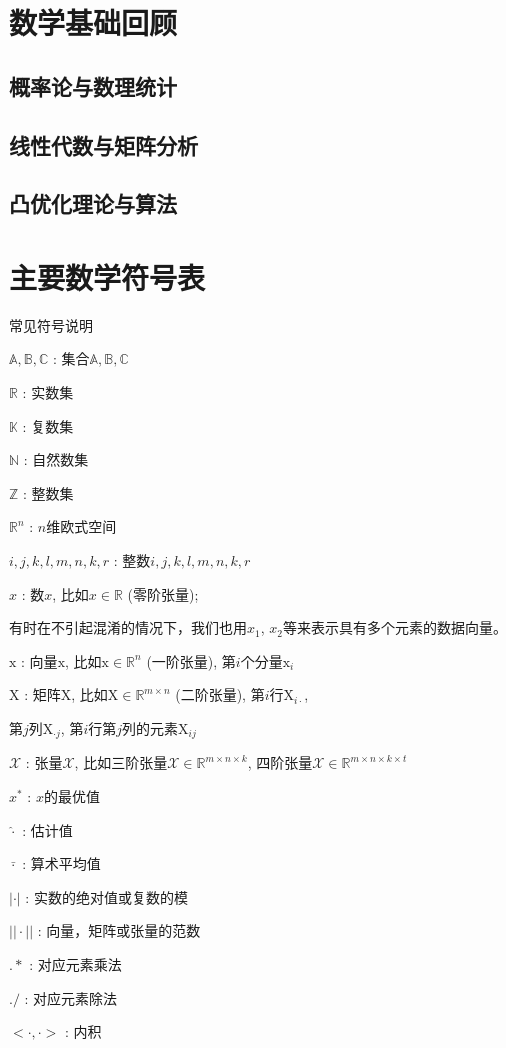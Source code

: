 \documentclass[UTF8,12pt]{ctexart}
\begin{document}
\newpage
\appendix
\section{数学基础回顾}
\subsection{概率论与数理统计}

\subsection{线性代数与矩阵分析}

\subsection{凸优化理论与算法}

\newpage
\section{主要数学符号表}

{\centering 常见符号说明}

\vspace{5mm}

$\mathbb{A,B,C}$ : \qquad 集合$\mathbb{A,B,C}$

$\mathbb{R}$ : \qquad 实数集

$\mathbb{K}$ : \qquad 复数集

$\mathbb{N}$ : \qquad 自然数集

$\mathbb{Z}$ : \qquad 整数集

$\mathbb{R}^n$ : \qquad  $n$维欧式空间

$\mathit{i,j,k,l,m,n,k,r}$ : \qquad 整数$\mathit{i,j,k,l,m,n,k,r}$

$\mathit{x}$ : \qquad 数$\mathit{x}$, 比如$\mathit{x} \in \mathbb{R}$ (零阶张量);

\qquad 有时在不引起混淆的情况下，我们也用$\mathit{x}_1$, $\mathit{x}_2$等来表示具有多个元素的数据向量。

$\mathrm{x}$ : \qquad 向量$\mathrm{x}$, 比如$\mathrm{x} \in \mathbb{R}^n$ (一阶张量), 第$i$个分量$\mathrm{x}_i$

$\mathrm{X}$ :  \qquad 矩阵$\mathrm{X}$, 比如$\mathrm{X} \in \mathbb{R}^{m \times n}$ (二阶张量), 第$i$行$\mathrm{X}_{i \cdot}$,

  \qquad \qquad 第$j$列$\mathrm{X}_{\cdot j}$, 第$i$行第$j$列的元素$\mathrm{X}_{ij}$

$\mathcal{X}$ : \qquad 张量$\mathcal{X}$, 比如三阶张量$\mathcal{X} \in \mathbb{R}^{m \times n \times k}$, 四阶张量$\mathcal{X} \in
\mathbb{R}^{m \times n \times k \times t}$

$ x^* $ : \qquad  $x$的最优值

$ \hat{\cdot} $ : \qquad  估计值

$ \bar{\cdot} $ : \qquad 算术平均值

$| \cdot |$ : \qquad 实数的绝对值或复数的模

$|| \cdot ||$ :  \qquad 向量，矩阵或张量的范数

$.*$ : \qquad 对应元素乘法

$./$ : \qquad 对应元素除法

$< \cdot, \cdot >$ : \qquad 内积

\newpage

%
\end{document}
